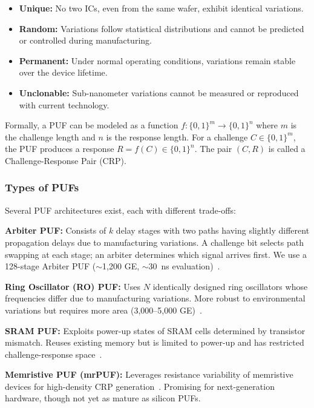 \documentclass[11pt,a4paper]{article}
\begin{document}
\begin{itemize}[leftmargin=*]
    \item \textbf{Unique:} No two ICs, even from the same wafer, exhibit identical variations.
    \item \textbf{Random:} Variations follow statistical distributions and cannot be predicted or controlled during manufacturing.
    \item \textbf{Permanent:} Under normal operating conditions, variations remain stable over the device lifetime.
    \item \textbf{Unclonable:} Sub-nanometer variations cannot be measured or reproduced with current technology.
\end{itemize}

Formally, a PUF can be modeled as a function $f: \{0,1\}^m \rightarrow \{0,1\}^n$ where $m$ is the challenge length and $n$ is the response length. For a challenge $C \in \{0,1\}^m$, the PUF produces a response $R = f(C) \in \{0,1\}^n$. The pair $(C, R)$ is called a Challenge-Response Pair (CRP).

\subsubsection{Types of PUFs}

Several PUF architectures exist, each with different trade-offs:

\textbf{Arbiter PUF:} Consists of $k$ delay stages with two paths having slightly different propagation delays due to manufacturing variations. A challenge bit selects path swapping at each stage; an arbiter determines which signal arrives first. We use a 128-stage Arbiter PUF ($\sim$1,200 GE, $\sim$30~ns evaluation)~\cite{arbiter_puf_iot}.

\textbf{Ring Oscillator (RO) PUF:} Uses $N$ identically designed ring oscillators whose frequencies differ due to manufacturing variations. More robust to environmental variations but requires more area (3,000--5,000 GE)~\cite{ro_puf_dependable, ro_puf_design}.

\textbf{SRAM PUF:} Exploits power-up states of SRAM cells determined by transistor mismatch. Reuses existing memory but is limited to power-up and has restricted challenge-response space~\cite{sram_puf_bch}.

\textbf{Memristive PUF (mrPUF):} Leverages resistance variability of memristive devices for high-density CRP generation~\cite{mrpuf}. Promising for next-generation hardware, though not yet as mature as silicon PUFs.
\end{document}
